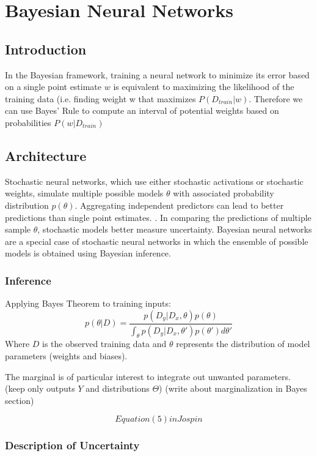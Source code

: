 \chapter{Bayesian Neural Networks}

\section{Introduction}
 In the Bayesian framework, training a neural network to minimize its error based on a single point estimate $w$ is equivalent to maximizing the likelihood of the training data (i.e. finding weight w that maximizes $P(D_{train}|w)$. Therefore we can use Bayes’ Rule to compute an interval of potential weights based on probabilities $P(w|D_{train})$

\section{Architecture}

Stochastic neural networks, which use either stochastic activations or stochastic weights, simulate multiple possible models $\theta$ with associated probability distribution $p(\theta)$.  Aggregating independent predictors can lead to better predictions than single point estimates. \cite{Jospin}.  In comparing the predictions of multiple sample $\theta$, stochastic models better measure uncertainty.  Bayesian neural networks are a special case of stochastic neural networks in which the ensemble of possible models is obtained using Bayesian inference. \cite{mackay1992practical}

\subsection{Inference}

Applying Bayes Theorem to training inputs:
$$
p(\theta|D) = \frac{p(D_{y}|D_{x},\theta)p(\theta)}{\int_\theta p(D_{y}|D_{x},\theta')p(\theta')d\theta'}
$$
Where $D$ is the observed training data and $\theta$ represents the distribution of model parameters (weights and biases).


The marginal is of particular interest to integrate out unwanted parameters.  (keep only outputs $Y$ and distributions $\Theta$)
(write about marginalization in Bayes section)

$$
Equation (5) in Jospin
$$


\subsection{Description of Uncertainty}

